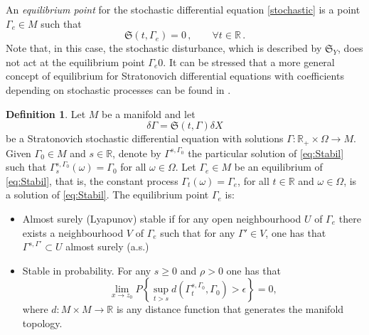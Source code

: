 \documentclass[11pt]{article}
\theoremstyle{plain}
\theoremstyle{definition}
\newtheorem{definition}[theorem]{Definition}
\begin{document}
An {\it equilibrium point} for the stochastic differential equation \eqref{stochastic} is a point $\Gamma_e\in M$ such that
$$
\mathfrak{S} (t,
  \Gamma_e)=0\,,\qquad \forall t\in \mathbb{R}\,.
$$
Note that, in this case, the stochastic disturbance, which is described by $\mathfrak{S}_Y$, does not act at the equilibrium point $\Gamma_e0$. It can be stressed that a more general concept of equilibrium for Stratonovich differential equations with coefficients depending on stochastic processes can be found in \cite{LO08}.


\begin{definition}
Let $M$ be a manifold and let
\begin{equation}\label{eq:Stabil}
\delta \Gamma = \mathfrak{S}(t, \Gamma)\delta X
\end{equation}
be a Stratonovich stochastic differential equation with solutions $\Gamma:\mathbb{R}_+\times\Omega\rightarrow M$.
Given $\Gamma_0 \in  M$ and $s \in  \mathbb{R}$, denote by $\Gamma^{s,\Gamma_0}$ the particular solution of \eqref{eq:Stabil} such that $\Gamma_s^{s,\Gamma_0}(\omega)=\Gamma_0$ for all $\omega\in \Omega$. Let $\Gamma_e \in  M$ be an equilibrium of \eqref{eq:Stabil}, that is, the constant process
$\Gamma_t(\omega) = \Gamma_e$, for all $t \in \mathbb{R}$ and $\omega\in \Omega$, is a solution of \eqref{eq:Stabil}. The equilibrium point $\Gamma_e$ is:
\begin{itemize}
\item Almost surely (Lyapunov) stable if for  any open neighbourhood $U$ of $\Gamma_e$ there exists a
neighbourhood $V$ of $\Gamma_e$ such that for any $\Gamma'\in V$, one has that $\Gamma^{s,\Gamma'}\subset U$ almost surely (a.s.)
\item Stable in probability. For any $s\geq 0$ and $\rho>0$ one has that
$$
\lim_{x\rightarrow {z_0}} P\left\{\sup_{t>s}d(\Gamma^{s,\Gamma_0}_t,\Gamma_0)>\epsilon\right\}=0,
$$
where $d:M\times M\to\mathbb{R}$ is any distance function that generates the manifold topology.
\end{itemize}
\end{definition}
\end{document}
